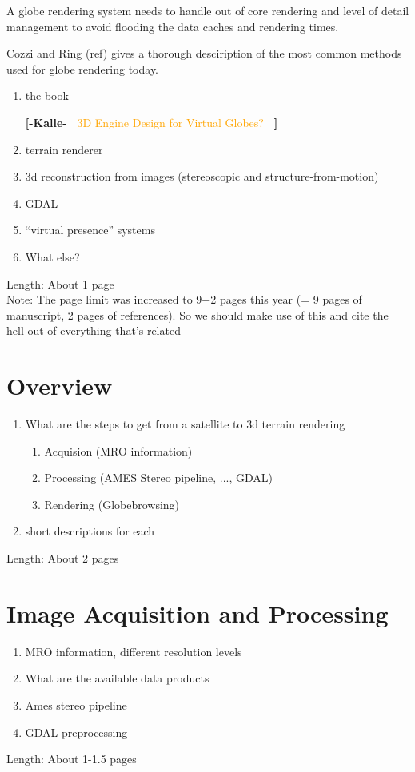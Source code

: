 \documentclass[journal]{vgtc}                %
\newcommand{\kallecomment}[1]{\textbf{[-Kalle-~}
    \textcolor{orange}{#1}
    \textbf{~]}}
\begin{document}
A globe rendering system needs to handle out of core rendering and level of detail management to avoid flooding the data caches and rendering times.

Cozzi and Ring (ref) gives a thorough desciription of the most common methods used for globe rendering today. 

\begin{enumerate}
\item the book

\kallecomment{3D Engine Design for Virtual Globes?}

\item terrain renderer
\item 3d reconstruction from images (stereoscopic and structure-from-motion)
\item GDAL
\item ``virtual presence'' systems
\item What else?
\end{enumerate}
Length: About 1 page\\
Note:  The page limit was increased to 9+2 pages this year (= 9 pages of manuscript, 2 pages of references). So we should make use of this and cite the hell out of everything that's related

\section{Overview} \label{sec:overview}



\begin{enumerate}
  \item What are the steps to get from a satellite to 3d terrain rendering
\begin{enumerate}
  \item Acquision (MRO information)
  \item Processing (AMES Stereo pipeline, ..., GDAL)
  \item Rendering (Globebrowsing)
\end{enumerate}
  \item short descriptions for each
\end{enumerate}
Length: About 2 pages

\section{Image Acquisition and Processing} \label{sec:imageacquisitionprocessing}
\begin{enumerate}
  \item MRO information, different resolution levels
  \item What are the available data products
  \item Ames stereo pipeline
  \item GDAL preprocessing
\end{enumerate}
Length: About 1-1.5 pages
\end{document}
